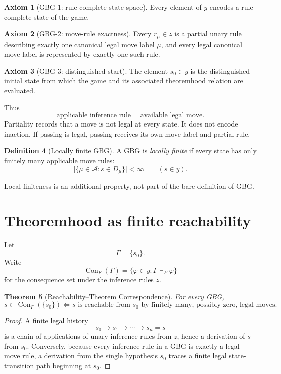 \documentclass[11pt]{article}
\newtheorem{theorem}{Theorem}[section]
\theoremstyle{definition}
\newtheorem{definition}[theorem]{Definition}
\newtheorem{axiom}[theorem]{Axiom}
\theoremstyle{remark}
\newcommand{\Conseq}{\operatorname{Con}}
\begin{document}
\begin{axiom}[GBG-1: rule-complete state space]
Every element of $y$ encodes a rule-complete state of the game.
\end{axiom}

\begin{axiom}[GBG-2: move-rule exactness]
Every $r_\mu\in z$ is a partial unary rule describing exactly one canonical legal move label $\mu$, and every legal canonical move label is represented by exactly one such rule.
\end{axiom}

\begin{axiom}[GBG-3: distinguished start]
The element $s_0\in y$ is the distinguished initial state from which the game and its associated theoremhood relation are evaluated.
\end{axiom}

Thus
\[
\boxed{\text{applicable inference rule}=\text{available legal move}.}
\]
Partiality records that a move is not legal at every state.  It does not encode inaction.  If passing is legal, passing receives its own move label and partial rule.

\begin{definition}[Locally finite GBG]
A GBG is \emph{locally finite} if every state has only finitely many applicable move rules:
\[
\bigl|\{\mu\in\mathcal A:s\in D_\mu\}\bigr|<\infty
\qquad(s\in y).
\]
\end{definition}

Local finiteness is an additional property, not part of the bare definition of GBG.

\section{Theoremhood as finite reachability}

Let
\[
\Gamma=\{s_0\}.
\]
Write
\[
\Conseq_F(\Gamma)=\{\varphi\in y:\Gamma\vdash_F\varphi\}
\]
for the consequence set under the inference rules $z$.

\begin{theorem}[Reachability--Theorem Correspondence]
For every GBG,
\[
\boxed{
s\in\Conseq_F(\{s_0\})
\iff
s\text{ is reachable from }s_0\text{ by finitely many, possibly zero, legal moves}.
}
\]
\end{theorem}

\begin{proof}
A finite legal history
\[
s_0\to s_1\to\cdots\to s_n=s
\]
is a chain of applications of unary inference rules from $z$, hence a derivation of $s$ from $s_0$.  Conversely, because every inference rule in a GBG is exactly a legal move rule, a derivation from the single hypothesis $s_0$ traces a finite legal state-transition path beginning at $s_0$.
\end{proof}
\end{document}
